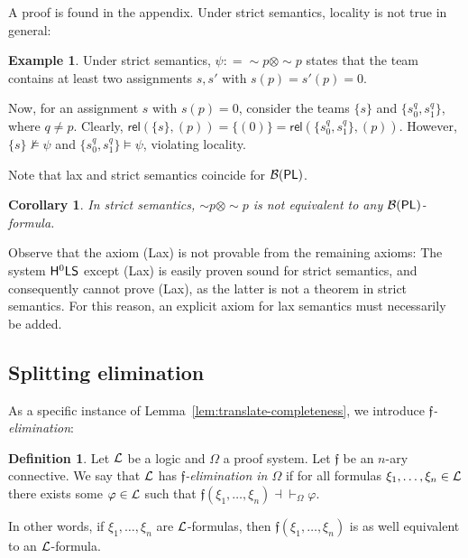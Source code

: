 \documentclass[a4paper,english,fleqn,11pt,final]{scrartcl}
\newcommand{\negg}{{\sim}}
\newcommand{\logic}[1]{\ensuremath{\mathsf{#1}}\xspace}
\newcommand{\PL}{\logic{PL}}
\newcommand{\calB}{\protect\ensuremath{\mathcal{B}}}
\newcommand{\calL}{\protect\ensuremath{\mathcal{L}}}
\newcommand{\sfS}{\protect\ensuremath{\mathsf{S}}}
\newcommand{\sfH}{\protect\ensuremath{\mathsf{H}}}
\newcommand{\sfL}{\protect\ensuremath{\mathsf{L}}}
\providecommand{\dfn}{\mathrel{\mathop:}=}
\newcommand{\eqpr}{\dashv\vdash}
\newcommand{\tens}{\otimes}
\newcommand{\Deriv}[1]{{\normalfont\textsf{#1}}}
\newcommand{\rel}{\mathsf{rel}}
\theoremstyle{plain}
\newtheorem{corollary}[theorem]{Corollary}
\theoremstyle{definition}
\newtheorem{definition}[theorem]{Definition}
\newtheorem{example}[theorem]{Example}
\begin{document}
A proof is found in the appendix.
Under strict semantics, locality is not true in general:

\begin{example}
Under strict semantics, $\psi\dfn \negg p \tens \negg p$ states that the team contains at least two assignments $s,s'$ with $s(p) = s'(p) = 0$.

Now, for an assignment $s$ with $s(p) = 0$, consider the teams $\{s\}$ and $\{ s^{q}_0, s^{q}_1 \}$, where $q \neq p$.
Clearly, $\rel(\{ s \},(p)) = \{ (0) \} = \rel(\{ s^{q}_0, s^{q}_1 \}, (p))$.
However, $\{ s \} \nvDash \psi$ and $\{ s^{q}_0, s^{q}_1 \} \vDash \psi$, violating locality.
\end{example}

Note that lax and strict semantics coincide for $\calB(\PL)$.

\label{p:count}

\begin{corollary}\label{cor:no-counting}
In strict semantics, $\negg p \tens \negg p$ is not equivalent to any $\calB(\PL)$-formula.
\end{corollary}


Observe that the axiom \Deriv{(Lax)} is not provable from the remaining axioms:
The system $\sfH^0\sfL\sfS$ except \Deriv{(Lax)} is easily proven sound for strict semantics, and consequently cannot prove \Deriv{(Lax)}, as the latter is not a theorem in strict semantics.
For this reason, an explicit axiom for lax semantics must necessarily be added.



\subsection{Splitting elimination}



As a specific instance of Lemma~\ref{lem:translate-completeness}, we introduce \emph{$\mathfrak{f}$-elimination}:

\begin{definition}\label{def:f-elim}
	Let $\calL$ be a logic and $\Omega$ a proof system. Let $\mathfrak{f}$ be an $n$-ary connective.
	We say that $\calL$ has \emph{$\mathfrak{f}$-elimination in $\Omega$} if for all formulas $\xi_1,\ldots,\xi_n \in \calL$ there exists some $\varphi \in \calL$ such that $\mathfrak{f}(\xi_1, \ldots, \xi_n) \eqpr_\Omega \varphi$.
\end{definition}
In other words, if $\xi_1, \ldots, \xi_n$ are $\calL$-formulas, then $\mathfrak{f}(\xi_1, \ldots, \xi_n)$ is as well equivalent to an $\calL$-formula.
\end{document}
